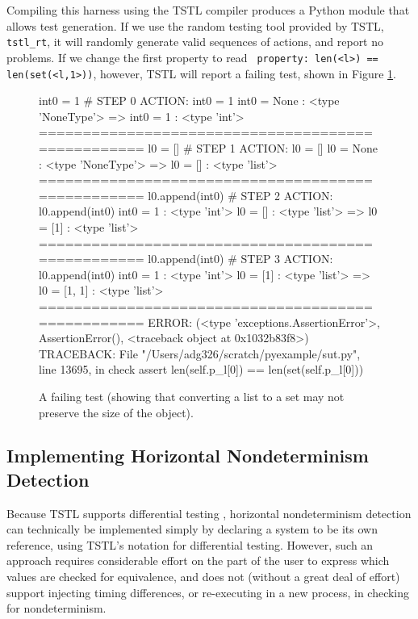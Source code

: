 Compiling this harness using
the TSTL compiler produces a Python module that allows test
generation.  If we use the random testing tool provided by TSTL, {\tt
  tstl\_rt}, it will randomly generate valid sequences of actions, and
report no problems.  If we change the first property to read {\tt
  property: len(<l>) == len(set(<l,1>))}, however, TSTL will report a
failing test, shown in Figure \ref{fig:setlistfail}.

\begin{figure}
{\scriptsize
\begin{code}
int0 = 1                                                                 \# STEP 0
ACTION: int0 = 1 
int0 = None : <type 'NoneType'>
=> int0 = 1 : <type 'int'>
==================================================
l0 = []                                                                  \# STEP 1
ACTION: l0 = [] 
l0 = None : <type 'NoneType'>
=> l0 = [] : <type 'list'>
==================================================
l0.append(int0)                                                          \# STEP 2
ACTION: l0.append(int0) 
int0 = 1 : <type 'int'>
l0 = [] : <type 'list'>
=> l0 = [1] : <type 'list'>
==================================================
l0.append(int0)                                                          \# STEP 3
ACTION: l0.append(int0) 
int0 = 1 : <type 'int'>
l0 = [1] : <type 'list'>
=> l0 = [1, 1] : <type 'list'>
==================================================
ERROR: (<type 'exceptions.AssertionError'>,
  AssertionError(), <traceback object at 0x1032b83f8>)
TRACEBACK:
  File "/Users/adg326/scratch/pyexample/sut.py",
  line 13695, in check
    assert len(self.p\_l[0]) == len(set(self.p\_l[0]))
\end{code}
}
\caption{A failing test (showing that converting a list to a set may
  not preserve the size of the object).}
\label{fig:setlistfail}
\end{figure}

\subsection{Implementing Horizontal Nondeterminism Detection}

Because TSTL supports differential testing \cite{tstlsttt}, horizontal
nondeterminism detection can technically be implemented simply by
declaring a system to be its own reference, using TSTL's notation for
differential testing.  However, such an approach requires considerable effort
on the part of the user to express which values are checked for
equivalence, and does not (without a great deal of effort) support injecting timing differences,
or re-executing in a new process, in checking for nondeterminism.


